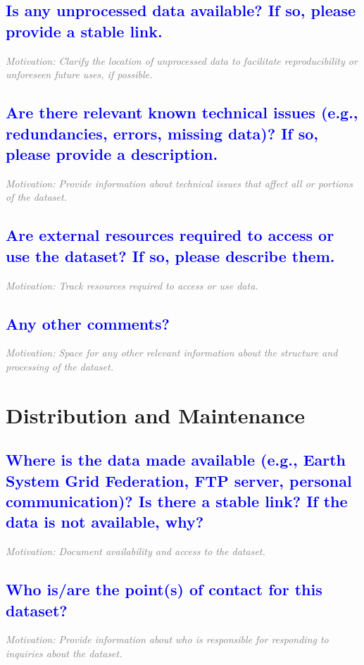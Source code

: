 \documentclass[letterpaper, 10 pt, transmag]{IEEEtran}
\begin{document}
\textcolor{blue}{\subsection{Is any unprocessed data available? If so, please provide a stable link.}}
\textcolor{gray}{\textit{Motivation: Clarify the location of unprocessed data to facilitate reproducibility or unforeseen future uses, if possible.}}

\textcolor{blue}{\subsection{Are there relevant known technical issues (e.g., redundancies, errors, missing data)? If so, please provide a description.}}
\textcolor{gray}{\textit{Motivation: Provide information about technical issues that affect all or portions of the dataset.}}

\textcolor{blue}{\subsection{Are external resources required to access or use the dataset? If so, please describe them.}}
\textcolor{gray}{\textit{Motivation: Track resources required to access or use data.}}

\textcolor{blue}{\subsection{Any other comments?}}
\textcolor{gray}{\textit{Motivation: Space for any other relevant information about the structure and processing of the dataset.}}  
\vspace{10mm}

\section{Distribution and Maintenance}

\textcolor{blue}{\subsection{Where is the data made available (e.g., Earth System Grid Federation, FTP server, personal communication)? Is there a stable link? If the data is not available, why?}}
\textcolor{gray}{\textit{Motivation: Document availability and access to the dataset.}}

\textcolor{blue}{\subsection{Who is/are the point(s) of contact for this dataset?}}
\textcolor{gray}{\textit{Motivation: Provide information about who is responsible for responding to inquiries about the dataset.}}
\end{document}
